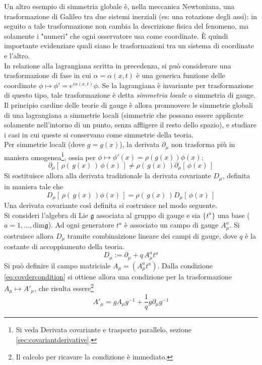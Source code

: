 Un altro esempio di simmetria globale è, nella meccanica Newtoniana, una
trasformazione di Galileo tra due sistemi inerziali (es: una rotazione degli assi):
in seguito a tale trasformazione non cambia la descrizione fisica del fenomeno,
ma solamente i "numeri" che ogni osservatore usa come coordinate. È quindi importante
evidenziare quali siano le trasformazioni tra un sistema di coordinate e l'altro.\\

In relazione alla lagrangiana scritta in precedenza, si può considerare una trasformazione
di fase in cui $\alpha = \alpha(x,t)$ è una generica funzione delle coordinate
$\phi \mapsto \phi' = e^{i\alpha(x,t)}\phi$. Se la lagrangiana è invariante per
trasformazione di questo tipo, tale trasformazione è detta \emph{simmetria locale}
o simmetria di gauge.\\

Il principio cardine delle teorie di gauge è allora promuovere le simmetrie globali
di una lagrangiana a simmetrie locali (simmetrie che possano essere applicate
solamente nell'intorno di un punto, senza affligere il resto dello spazio), e studiare
i casi in cui queste si conservano come simmetrie della teoria. \\

Per simmetrie locali (dove $g = g(x)$), la derivata $\partial _\mu$ non trasforma
più in maniera omogenea\footnote{
    Si veda Derivata covariante e trasporto parallelo, sezione \ref{sec:covariantderivative}.
}, ossia per $\phi \mapsto \phi'(x) = \rho(g(x))\phi(x)$:
$$
   \partial _\mu [\, \rho(\, g(x) \,) \, \phi(x)\, ]
       \neq  \rho(\, g(x) \,) \partial _\mu [\, \phi(x) \,]
$$
Si sostituisce allora alla derivata tradizionale la derivata covariante $D _\mu$,
definita in maniera tale che
\begin{equation}\label{eq:covdercondition}
   D _\mu[\, \rho(\, g(x) \,) \phi(x) \,] = \rho(\, g(x) \,) D _\mu[\, \phi(x) \,]
\end{equation}
Una derivata covariante così definita si costruisce nel modo seguente.\\

Si consideri l'algebra di Lie $\mathfrak{g}$ associata al gruppo di gauge e sia
$\{ t^a \}$ una base ($a = 1, \dots, \mathrm{dim}\mathfrak{g}$). Ad ogni generatore
$ t^a $ è associato un campo di gauge $ A^a_\mu $. Si costruisce allora $ D _\mu $ tramite
combinaizione lineare dei campi di gauge, dove $q$ è la costante di accoppiamento della
teoria.
\begin{equation}
   D _\mu := \partial _\mu + q \, A^a_\mu t^a
\end{equation}
Si può definire il campo matriciale $A _\mu = (A^a_\mu t^a)$. Dalla condizione
\ref{eq:covdercondition} si ottiene allora una condizione per la trasformazione
 $A _\mu \mapsto A' _\mu$, che risulta essere\footnote{ Il calcolo per ricavare
la condizione è immediato.}
\begin{equation}\label{eq:gaugetrasform}
   A'_\mu = g A_\mu g^{-1} + \frac{1}{q} g \partial _\mu g^ {-1}
\end{equation}

